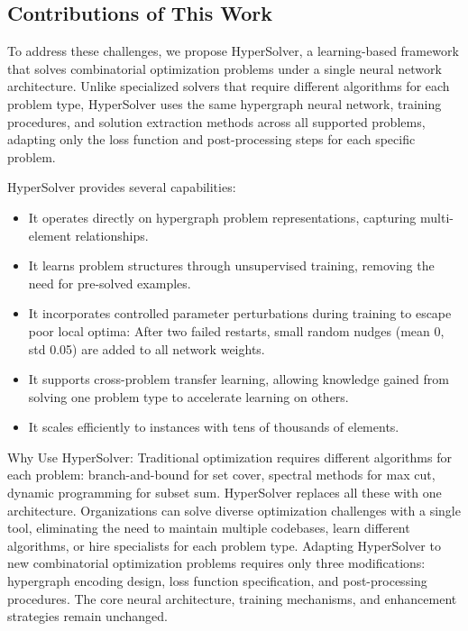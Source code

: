 \documentclass[conference]{IEEEtran}
\begin{document}
\subsection{Contributions of This Work}
To address these challenges, we propose HyperSolver, a learning-based framework that solves combinatorial optimization problems under a single neural network architecture. Unlike specialized solvers that require different algorithms for each problem type, HyperSolver uses the same hypergraph neural network, training procedures, and solution extraction methods across all supported problems, adapting only the loss function and post-processing steps for each specific problem. 

HyperSolver provides several capabilities:
\begin{itemize}
\item It operates directly on hypergraph problem representations, capturing multi-element relationships.
\item It learns problem structures through unsupervised training, removing the need for pre-solved examples.
\item It incorporates controlled parameter perturbations during training to escape poor local optima: After two failed restarts, small random nudges (mean 0, std 0.05) are added to all network weights.
\item It supports cross-problem transfer learning, allowing knowledge gained from solving one problem type to accelerate learning on others.
\item It scales efficiently to instances with tens of thousands of elements.
\end{itemize}

Why Use HyperSolver: Traditional optimization requires different algorithms for each problem: branch-and-bound for set cover, spectral methods for max cut, dynamic programming for subset sum. HyperSolver replaces all these with one architecture. Organizations can solve diverse optimization challenges with a single tool, eliminating the need to maintain multiple codebases, learn different algorithms, or hire specialists for each problem type. Adapting HyperSolver to new combinatorial optimization problems requires only three modifications: hypergraph encoding design, loss function specification, and post-processing procedures. The core neural architecture, training mechanisms, and enhancement strategies remain unchanged.
\end{document}
